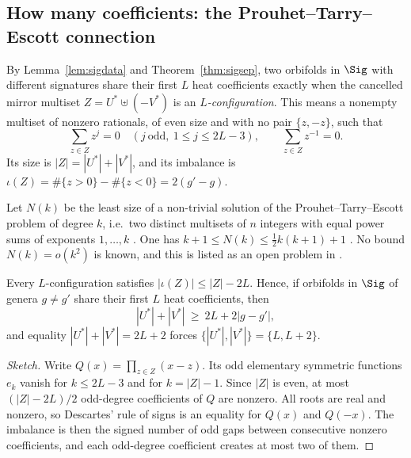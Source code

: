 %

\subsection{How many coefficients: the Prouhet--Tarry--Escott connection}\label{subsec:pte}

By Lemma~\ref{lem:sigdata} and Theorem~\ref{thm:sigsep}, two orbifolds in $\Sig$ with different
signatures share their first $L$ heat coefficients exactly when the cancelled mirror multiset
$Z=U^*\uplus(-V^*)$ is an \emph{$L$-configuration}. This means a nonempty multiset of nonzero
rationals, of even size and with no pair $\{z,-z\}$, such that
\[
  \sum_{z\in Z}z^{j}=0\quad(j\ \text{odd},\ 1\le j\le 2L-3),\qquad \sum_{z\in Z}z^{-1}=0 .
\]
Its size is $|Z|=|U^*|+|V^*|$, and its imbalance is $\iota(Z)=\#\{z>0\}-\#\{z<0\}=2(g'-g)$.

Let $N(k)$ be the least size of a non-trivial solution of the Prouhet--Tarry--Escott problem
of degree $k$, i.e.\ two distinct multisets of $n$ integers with equal power sums of exponents
$1,\dots,k$ \cite[\S1]{borweiningalls1994}. One has $k+1\le N(k)\le\tfrac12k(k+1)+1$
\cite[Props.~2, 3]{borweiningalls1994}. No bound $N(k)=o(k^2)$ is known, and this is listed
as an open problem in \cite[\S6]{borweiningalls1994}.

\begin{theorem}\label{thm:ptedescartes}
Every $L$-configuration satisfies $|\iota(Z)|\le|Z|-2L$. Hence, if orbifolds in $\Sig$ of genera
$g\neq g'$ share their first $L$ heat coefficients, then
\[
  |U^*|+|V^*|\ \ge\ 2L+2|g-g'| ,
\]
and equality $|U^*|+|V^*|=2L+2$ forces $\{|U^*|,|V^*|\}=\{L,L+2\}$.
\end{theorem}

\begin{proof}[Sketch]
Write $Q(x)=\prod_{z\in Z}(x-z)$. Its odd elementary symmetric functions $e_k$ vanish for
$k\le2L-3$ and for $k=|Z|-1$. Since $|Z|$ is even, at most $(|Z|-2L)/2$ odd-degree coefficients
of $Q$ are nonzero. All roots are real and nonzero, so Descartes' rule of signs is an equality
for $Q(x)$ and $Q(-x)$. The imbalance is then the signed number of odd gaps between consecutive
nonzero coefficients, and each odd-degree coefficient creates at most two of them.
\end{proof}

